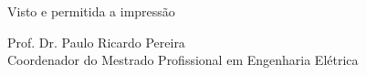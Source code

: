 \begin{folhadeaprovacao}
    \vspace*{\fill}
    \begin{flushleft}
    	Visto e permitida a impressão\\
        \imprimirlocal
    \end{flushleft}
    
    \vspace*{\fill}
    \hspace{.4\textwidth}
    \begin{minipage}{.5\textwidth}
    	Prof. Dr. Paulo Ricardo Pereira \\
        Coordenador do Mestrado Profissional em Engenharia Elétrica
    \end{minipage}%
  
\end{folhadeaprovacao}